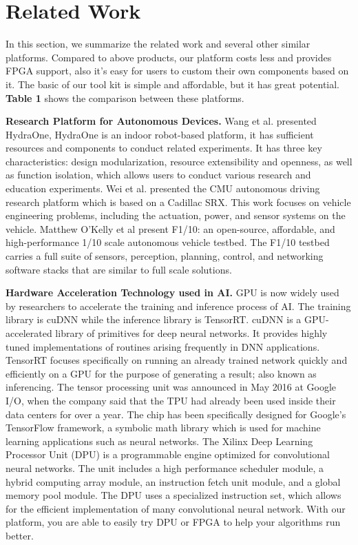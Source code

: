 \section{Related Work}
In this section, we summarize the related work and several other similar platforms. Compared to above products, our platform costs less and provides FPGA support, also it's easy for users to custom their own components based on it. The basic of our tool kit is simple and affordable, but it has great potential. \textbf{Table 1} shows the comparison between these platforms.

\textbf{Research Platform for Autonomous Devices.} Wang et al. presented HydraOne\cite{wang2019hydraone}, HydraOne is an indoor robot-based platform, it has sufficient resources and components to conduct related experiments. It has three key characteristics: design modularization, resource extensibility and openness, as well as function isolation, which allows users to conduct various research and education experiments. Wei et al. presented the CMU autonomous driving research platform which is based on a Cadillac SRX\cite{wei2013towards}. This work focuses on vehicle engineering problems, including the actuation, power, and sensor systems on the vehicle. Matthew O’Kelly et al present F1/10\cite{o2019f1}: an open-source, affordable, and high-performance 1/10 scale autonomous vehicle testbed. The F1/10 testbed carries a full suite of sensors, perception, planning, control, and networking software stacks that are similar to full scale solutions. 

\textbf{Hardware Acceleration Technology used in AI.} GPU\cite{nurvitadhi2016accelerating} is now widely used by researchers to accelerate the training and inference process of AI. The training library is cuDNN\cite{cudnn} while the inference library is TensorRT\cite{tensorrt}. cuDNN is a GPU-accelerated library of primitives for deep neural networks. It provides highly tuned implementations of routines arising frequently in DNN applications. TensorRT focuses specifically on running an already trained network quickly and efficiently on a GPU for the purpose of generating a result; also known as inferencing. The tensor processing unit was announced in May 2016 at Google I/O, when the company said that the TPU had already been used inside their data centers for over a year\cite{techradar}. The chip has been specifically designed for Google's TensorFlow framework, a symbolic math library which is used for machine learning applications such as neural networks.\cite{tensorprocessingunit} The Xilinx Deep Learning Processor Unit (DPU)\cite{dnndk} is a programmable engine optimized for convolutional neural networks. The unit includes a high performance scheduler module, a hybrid computing array module, an instruction fetch unit module, and a global memory pool module. The DPU uses a specialized instruction set, which allows for the efficient implementation of many convolutional neural network. With our platform, you are able to easily try DPU or FPGA to help your algorithms run better.